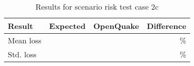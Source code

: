 \begin{table}[htbp]

\centering
\begin{tabular}{ l r r r }

\hline
\rowcolor{anti-flashwhite}
\bf{Result} & \bf{Expected} & \bf{OpenQuake} & \bf{Difference}\\
\hline
Mean loss &  &  & \% \\
Std. loss &  &  & \% \\
\hline
\end{tabular}

\caption{Results for scenario risk test case 2c}
\label{tab:result-sr-2c}
\end{table}